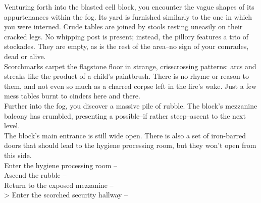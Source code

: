 Venturing forth into the blasted cell block, you encounter the vague shapes of its appurtenances within the fog. Its yard is furnished similarly to the one in which you were interned. Crude tables are joined by stools resting uneasily on their cracked legs. No whipping post is present; instead, the pillory features a trio of stockades. They are empty, as is the rest of the area--no sign of your comrades, dead or alive.\\

Scorchmarks carpet the flagstone floor in strange, crisscrossing patterns: arcs and streaks like the product of a child’s paintbrush. There is no rhyme or reason to them, and not even so much as a charred corpse left in the fire’s wake. Just a few mess tables burnt to cinders here and there.\\

Further into the fog, you discover a massive pile of rubble. The block's mezzanine balcony has crumbled, presenting a possible--if rather steep--ascent to the next level.\\

The block’s main entrance is still wide open. There is also a set of iron-barred doors that should lead to the hygiene processing room, but they won’t open from this side.\\

 Enter the hygiene processing room -- \\
 Ascend the rubble -- \\
 Return to the exposed mezzanine -- \\
> Enter the scorched security hallway -- 